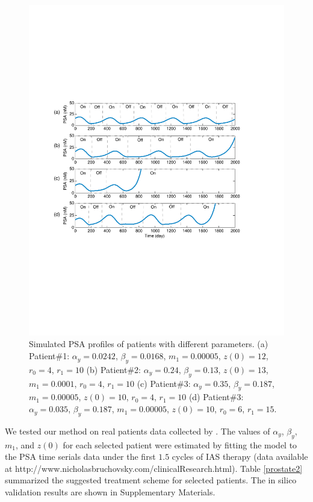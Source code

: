 \begin{figure}[htb]
\centering
\includegraphics[scale=0.5]{fig-prostatetraj2}
\caption{Simulated PSA profiles of patients with different parameters. (a) Patient\#1: $\alpha_y=0.0242$, $\beta_y=0.0168$, $m_1=0.00005$, $z(0)=12$, $r_0=4$, $r_1=10$ (b) Patient\#2: $\alpha_y=0.24$, $\beta_y=0.13$, $z(0)=13$, $m_1=0.0001$, $r_0=4$, $r_1=10$ (c) Patient\#3: $\alpha_y=0.35$, $\beta_y=0.187$, $m_1=0.00005$, $z(0)=10$, $r_0=4$, $r_1=10$ (d) Patient\#3: $\alpha_y=0.035$, $\beta_y=0.187$, $m_1=0.00005$, $z(0)=10$, $r_0=6$, $r_1=15$.}
\label{patients}
\end{figure}


We tested our method on real patients data collected by \cite{bruchovsky07}. The values of $\alpha_y$, $\beta_y$, $m_1$, and $z(0)$ for each selected patient were estimated by fitting the model to the PSA time serials data under the first $1.5$ cycles of IAS therapy (data available at http://www.nicholasbruchovsky.com/clinicalResearch.html). Table \ref{prostate2} summarized the suggested treatment scheme for selected patients. The in silico validation results are shown in Supplementary Materials.


